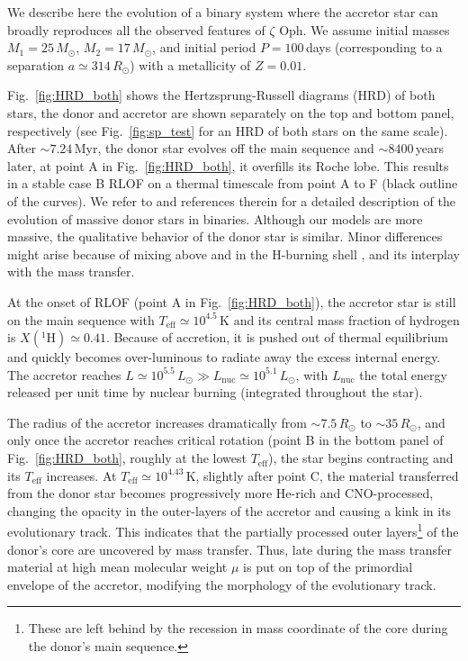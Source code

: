 \documentclass[twocolumn,twocolappendix,trackchanges]{aastex63}
\DeclareRobustCommand{\Figref}[1]{Fig.~\ref{#1}}
\newcommand{\zoph}{$\zeta$ Oph}
\begin{document}
We describe here the evolution of a binary system where the accretor
star can broadly reproduces all the observed features of \zoph. We
assume initial masses $M_1=25\,M_\odot$, $M_2=17\,M_\odot$, and initial
period $P=100$\,days (corresponding to a separation
$a\simeq314\,R_\odot$) with a metallicity of $Z=0.01$.

\Figref{fig:HRD_both} shows the Hertzsprung-Russell diagrams (HRD) of
both stars, the donor and accretor are shown separately on the top and
bottom panel, respectively (see \Figref{fig:sp_test} for an HRD of both stars on the same scale). After $\sim$$7.24$\,Myr, the donor star evolves off the main sequence and
$\sim8400$\,years later, at point A in \Figref{fig:HRD_both}, it overfills its Roche lobe. This results in a stable case B RLOF on a thermal timescale from point A to F (black outline of the curves). We refer to \cite{gotberg:17, klencki:20, laplace:21, blagorodnova:21} and references therein for a detailed description of the evolution of massive donor stars in binaries. Although our models are more massive, the qualitative behavior of the donor star is similar. Minor differences might arise because of mixing above and in the H-burning shell \citep[e.g.,][]{schootemeijer:19, klencki:21}, and its interplay with the mass transfer.

At the onset of RLOF (point A in \Figref{fig:HRD_both}), the accretor star is still on the main sequence with
$T_\mathrm{eff}\simeq10^{4.5}$\,K and its central mass fraction of hydrogen is $X(^1\mathrm{H})\simeq
0.41$. Because of accretion, it is pushed out of thermal equilibrium and quickly becomes over-luminous to radiate away the excess internal energy. The accretor reaches $L\simeq10^{5.5}\,L_\odot\gg
L_\mathrm{nuc}\simeq
10^{5.1}\,L_\odot$, with
$L_\mathrm{nuc}$ the total energy released per unit time by nuclear burning (integrated throughout the star).

The radius of the accretor increases dramatically from
$\sim7.5\,R_\odot$ to $\sim35\,R_\odot$, and only once the accretor
reaches critical rotation (point B in the bottom panel of
\Figref{fig:HRD_both}, roughly at the lowest $T_\mathrm{eff}$), the
star begins contracting and its $T_\mathrm{eff}$ increases. At
$T_\mathrm{eff}\simeq 10^{4.43}$\,K, slightly after point C, the material transferred from the
donor star becomes progressively more He-rich and CNO-processed,
changing the opacity in the outer-layers of the accretor and causing a
kink in its evolutionary track. This indicates that the partially
processed outer layers\footnote{These are left behind by the recession
  in mass coordinate of the core during the donor's main sequence.} of
the donor's core are uncovered by mass
transfer. %
Thus, late during the mass transfer material at high mean molecular
weight $\mu$ is put on top of the primordial envelope of the accretor,
modifying the morphology of the evolutionary track.
\end{document}
